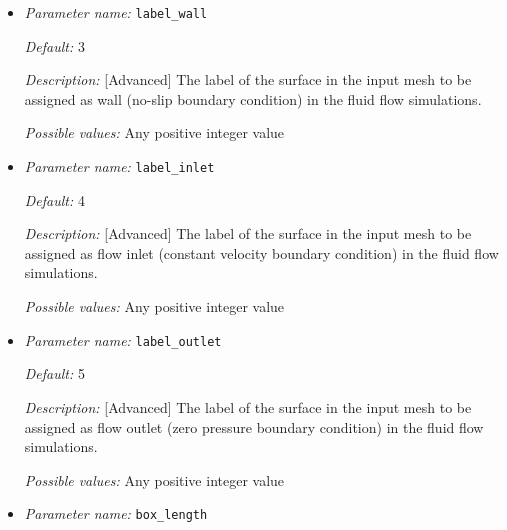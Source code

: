 \begin{itemize}

{\it Default:} 2

{\it Description:} [Standard] The label of the (volume) region which is supposed to be the medium (electrolyte) in the input mesh.

{\it Possible values:} Any positive integer value


\item {\it Parameter name:} {\tt label\_wall}
\label{parameters:label_wall}


{\it Default:} 3

{\it Description:} [Advanced] The label of the surface in the input mesh to be assigned as wall (no-slip boundary condition) in the fluid flow simulations.

{\it Possible values:} Any positive integer value


\item {\it Parameter name:} {\tt label\_inlet}
\label{parameters:label_inlet}


{\it Default:} 4

{\it Description:} [Advanced] The label of the surface in the input mesh to be assigned as flow inlet (constant velocity boundary condition) in the fluid flow simulations.

{\it Possible values:} Any positive integer value


\item {\it Parameter name:} {\tt label\_outlet}
\label{parameters:label_outlet}


{\it Default:} 5

{\it Description:} [Advanced] The label of the surface in the input mesh to be assigned as flow outlet (zero pressure boundary condition) in the fluid flow simulations.

{\it Possible values:} Any positive integer value


\item {\it Parameter name:} {\tt box\_length}
\label{parameters:box_length}



\end{itemize}

